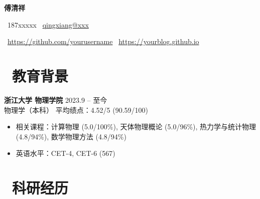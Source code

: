 \documentclass[11pt]{article}
\begin{document}

\centerline{\LARGE\bfseries{傅清祥}} 

\centerline{\normalsize{\faPhone\ 187xxxxx \quad \faEnvelopeO\ \href{mailto:qingxiang@xxx}{qingxiang@xxx}}} 

\centerline{\normalsize{\faGithubSquare\ \href{https://github.com/yourusername}{https://github.com/yourusername} \quad \faRssSquare\ \href{https://yourblog.github.io/}{https://yourblog.github.io}}} 
    
\section{\makebox[\widthof{\faGraduationCap}][c]{\color{CVBlue}\faGraduationCap}\ 教育背景}    
\textbf{浙江大学 物理学院} \hfill 2023.9 -- 至今\\[0.5em]
物理学（本科） \hfill 平均绩点：4.52/5 (90.59/100)
\begin{itemize}[nosep]
    \item 相关课程：计算物理 (5.0/100\%), 天体物理概论 (5.0/96\%), 热力学与统计物理 (4.8/94\%), 数学物理方法 (4.8/94\%)
    \item 英语水平：CET-4, CET-6 (567)
\end{itemize}

\section{\makebox[\widthof{\faUsers}][c]{\color{CVBlue}\faUsers}\ 科研经历}
\end{document}
